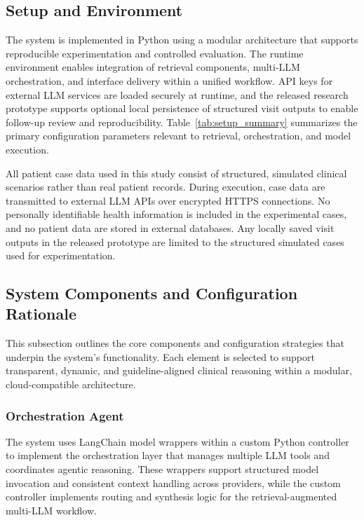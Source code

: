 \documentclass[preprint,12pt]{elsarticle}
\begin{document}
\subsection{Setup and Environment}
\label{sec:setup_environment}

The system is implemented in Python using a modular architecture that supports reproducible experimentation and controlled evaluation. The runtime environment enables integration of retrieval components, multi-LLM orchestration, and interface delivery within a unified workflow. API keys for external LLM services are loaded securely at runtime, and the released research prototype supports optional local persistence of structured visit outputs to enable follow-up review and reproducibility. Table~\ref{tab:setup_summary} summarizes the primary configuration parameters relevant to retrieval, orchestration, and model execution.

All patient case data used in this study consist of structured, simulated clinical scenarios rather than real patient records. During execution, case data are transmitted to external LLM APIs over encrypted HTTPS connections. No personally identifiable health information is included in the experimental cases, and no patient data are stored in external databases. Any locally saved visit outputs in the released prototype are limited to the structured simulated cases used for experimentation.


\subsection{System Components and Configuration Rationale}
\label{sec:component_selection}

This subsection outlines the core components and configuration strategies that underpin the system's functionality. Each element is selected to support transparent, dynamic, and guideline-aligned clinical reasoning within a modular, cloud-compatible architecture.


\subsubsection{Orchestration Agent}
The system uses LangChain model wrappers within a custom Python controller to implement the orchestration layer that manages multiple LLM tools and coordinates agentic reasoning. These wrappers support structured model invocation and consistent context handling across providers, while the custom controller implements routing and synthesis logic for the retrieval-augmented multi-LLM workflow.
\end{document}
